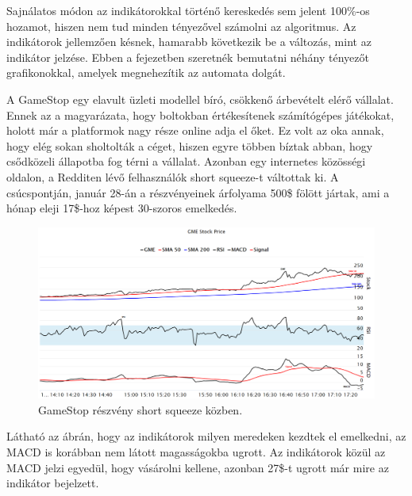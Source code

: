 Sajnálatos módon az indikátorokkal történő kereskedés sem jelent 100\%-os hozamot, hiszen nem tud minden tényezővel számolni az algoritmus. Az indikátorok jellemzően késnek, hamarabb következik be a változás, mint az indikátor jelzése. Ebben a fejezetben szeretnék bemutatni néhány tényezőt grafikonokkal, amelyek megnehezítik az automata dolgát.

A GameStop egy elavult üzleti modellel bíró, csökkenő árbevételt elérő vállalat. Ennek az a magyarázata, hogy boltokban értékesítenek számítógépes játékokat, holott már a platformok nagy része online adja el őket. Ez volt az oka annak, hogy elég sokan sholtolták a céget, hiszen egyre többen bíztak abban, hogy csődközeli állapotba fog térni a vállalat. Azonban egy internetes közösségi oldalon, a Redditen lévő felhasználók short squeeze-t váltottak ki. A csúcspontján, január 28-án a részvényeinek árfolyama 500\$ fölött jártak, ami a hónap eleji 17\$-hoz képest 30-szoros emelkedés.
\begin{figure}[ht]
\centering
\includegraphics[width=\textwidth]{images/GME_sq.png}
\caption{GameStop részvény short squeeze közben.}
\label{fig:GME_sq}
\end{figure}
Látható az ábrán, hogy az indikátorok milyen meredeken kezdtek el emelkedni, az MACD is korábban nem látott magasságokba ugrott. Az indikátorok közül az MACD jelzi egyedül, hogy vásárolni kellene, azonban 27\$-t ugrott már mire az indikátor bejelzett.

